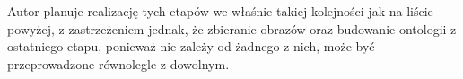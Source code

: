 Autor planuje realizację tych etapów we właśnie takiej kolejności jak na liście powyżej, z zastrzeżeniem jednak, że zbieranie obrazów oraz budowanie ontologii z ostatniego etapu, ponieważ nie zależy od żadnego z nich, może być przeprowadzone równolegle z dowolnym.







